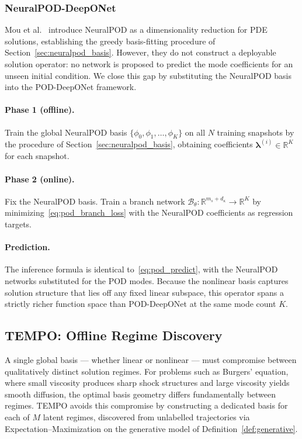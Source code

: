 \documentclass{article}
\begin{document}
\subsubsection{NeuralPOD-DeepONet}\label{sec:neuralpod_deeponet}

Mou et al.~\cite{Mou2026} introduce NeuralPOD as a dimensionality
reduction for PDE solutions, establishing the greedy basis-fitting
procedure of Section~\ref{sec:neuralpod_basis}.
However, they do not construct a deployable solution operator: no
network is proposed to predict the mode coefficients for an unseen
initial condition.
We close this gap by substituting the NeuralPOD basis into the
POD-DeepONet framework.

\paragraph{Phase 1 (offline).}
Train the global NeuralPOD basis
$\{\phi_0, \phi_1, \ldots, \phi_K\}$
on all $N$ training snapshots by the procedure of
Section~\ref{sec:neuralpod_basis}, obtaining coefficients
$\boldsymbol{\lambda}^{(i)} \in \mathbb{R}^K$ for each snapshot.

\paragraph{Phase 2 (online).}
Fix the NeuralPOD basis. Train a branch network
$\mathcal{B}_\theta : \mathbb{R}^{m_s + d_\kappa} \to \mathbb{R}^K$
by minimizing~\eqref{eq:pod_branch_loss} with the NeuralPOD
coefficients as regression targets.

\paragraph{Prediction.}
The inference formula is identical to~\eqref{eq:pod_predict}, with
the NeuralPOD networks substituted for the POD modes.
Because the nonlinear basis captures solution structure that lies
off any fixed linear subspace, this operator spans a strictly richer
function space than POD-DeepONet at the same mode count $K$.


\subsection{TEMPO: Offline Regime Discovery}\label{sec:offline}


A single global basis — whether linear or nonlinear — must compromise
between qualitatively distinct solution regimes.
For problems such as Burgers' equation, where small viscosity produces
sharp shock structures and large viscosity yields smooth diffusion, the
optimal basis geometry differs fundamentally between regimes.
TEMPO avoids this compromise by constructing a dedicated basis for each
of $M$ latent regimes, discovered from unlabelled trajectories via
Expectation--Maximization on the generative model of
Definition~\ref{def:generative}.
\end{document}
